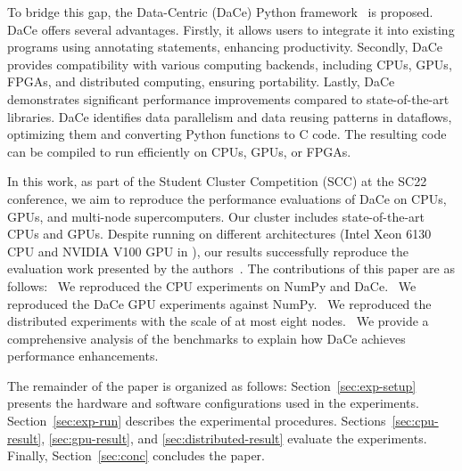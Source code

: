 To bridge this gap, the Data-Centric (DaCe) Python framework~\cite{dace2021} is proposed. DaCe offers several advantages. Firstly, it allows users to integrate it into existing programs using annotating statements, enhancing productivity. Secondly, DaCe provides compatibility with various computing backends, including CPUs, GPUs, FPGAs, and distributed computing, ensuring portability. Lastly, DaCe demonstrates significant performance improvements compared to state-of-the-art libraries. DaCe identifies data parallelism and data reusing patterns in dataflows, optimizing them and converting Python functions to C code. The resulting code can be compiled to run efficiently on CPUs, GPUs, or FPGAs.

In this work, as part of the Student Cluster Competition (SCC) at the SC22 conference, we aim to reproduce the performance evaluations of DaCe on CPUs, GPUs, and multi-node supercomputers. Our cluster includes state-of-the-art CPUs and GPUs. Despite running on different architectures (Intel Xeon 6130 CPU and NVIDIA V100 GPU in \cite{dace2021}), our results successfully reproduce the evaluation work presented by the authors~\cite{dace2021}. The contributions of this paper are as follows: 
~We reproduced the CPU experiments on NumPy and DaCe.
~We reproduced the DaCe GPU experiments against NumPy.
~We reproduced the distributed experiments with the scale of at most eight nodes.
~We provide a comprehensive analysis of the benchmarks to explain how DaCe achieves performance enhancements.

The remainder of the paper is organized as follows: Section~\ref{sec:exp-setup} presents the hardware and software configurations used in the experiments. Section~\ref{sec:exp-run} describes the experimental procedures. Sections~\ref{sec:cpu-result}, \ref{sec:gpu-result}, and \ref{sec:distributed-result} evaluate the experiments. Finally, Section~\ref{sec:conc} concludes the paper.